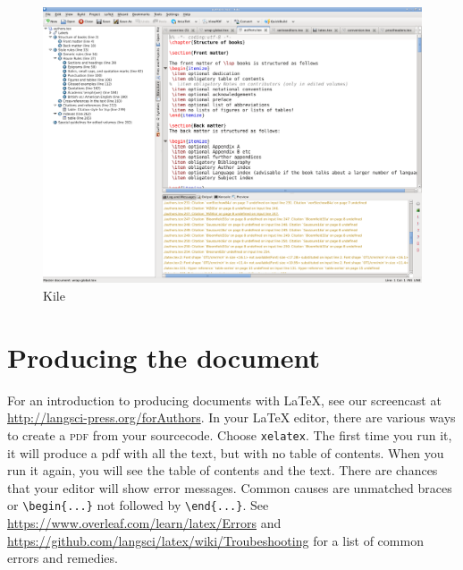 \begin{figure}
\includegraphics[width=\textwidth]{kile.png}
\caption{Kile}
\label{fig:latex:kile}
\end{figure}


%
\section{Producing the document}
For an introduction to producing documents with \LaTeX\xspace, see our screencast at \url{http://langsci-press.org/forAuthors}.
In your \LaTeX\xspace editor, there are various ways to create a \textsc{pdf} from your sourcecode. Choose \verb+xelatex+. The first time you run it, it will produce a pdf with all the text, but with no table of contents. When you run it again, you will see the table of contents and the text. There are chances that your editor will show error messages. Common causes are unmatched braces or \verb+\begin{...}+ not followed by \verb+\end{...}+. See \url{https://www.overleaf.com/learn/latex/Errors}
and
\url{https://github.com/langsci/latex/wiki/Troubeshooting} for a list of common errors and remedies.



